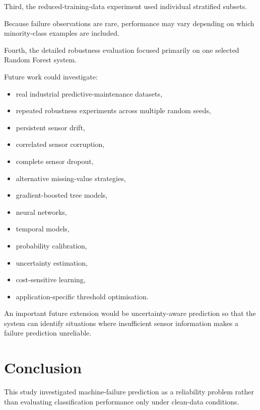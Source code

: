\documentclass[conference]{IEEEtran}
\begin{document}
Third, the reduced-training-data experiment used individual stratified subsets.

Because failure observations are rare, performance may vary depending on which minority-class examples are included.

Fourth, the detailed robustness evaluation focused primarily on one selected Random Forest system.

Future work could investigate:

\begin{itemize}

    \item real industrial predictive-maintenance datasets,
    \item repeated robustness experiments across multiple random seeds,
    \item persistent sensor drift,
    \item correlated sensor corruption,
    \item complete sensor dropout,
    \item alternative missing-value strategies,
    \item gradient-boosted tree models,
    \item neural networks,
    \item temporal models,
    \item probability calibration,
    \item uncertainty estimation,
    \item cost-sensitive learning,
    \item application-specific threshold optimisation.

\end{itemize}

An important future extension would be uncertainty-aware prediction so that the system can identify situations where insufficient sensor information makes a failure prediction unreliable.


\section{Conclusion}

This study investigated machine-failure prediction as a reliability problem rather than evaluating classification performance only under clean-data conditions.
\end{document}
